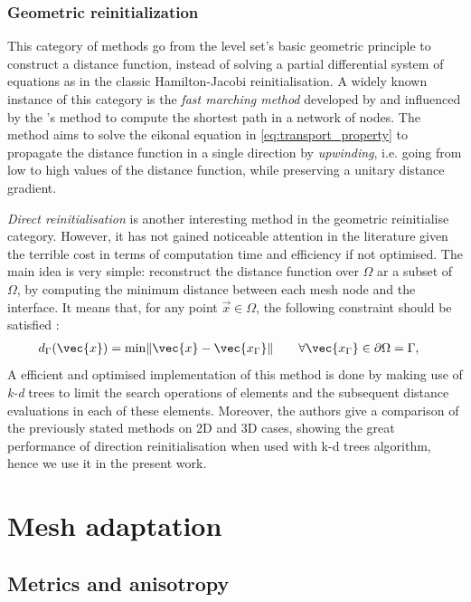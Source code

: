 \subsubsection{Geometric reinitialization}
%
This category of methods go from the level set's basic geometric principle to construct a distance function,
instead of solving a partial differential system of equations as in the classic Hamilton-Jacobi reinitialisation.
A widely known instance of this category is the \emph{fast marching method} developed by \citet{sethian_fast_1996}
and influenced by the \citet{dijkstra_note_1959}'s method to compute the shortest path in a network of nodes. 
The method aims to solve the eikonal equation in \cref{eq:transport_property} to propagate the distance function in a 
single direction by \emph{upwinding}, i.e. going from low to high values of the distance function, 
while preserving a unitary distance gradient.

\emph{Direct reinitialisation} is another interesting method in the geometric reinitialise category. However,
it has not gained noticeable attention in the literature given the terrible cost in terms of computation time and efficiency if not optimised.
The main idea is very simple: reconstruct the distance function over $\Omega$ ar a subset of $\Omega$, by computing the 
minimum distance between each mesh node and the interface. It means that, for any point $\vec{x} \in \Omega$, the following 
constraint should be satisfied \citet{osher_signed_2003}:
\begin{align}
\label{eq:min_distance}
& d_\Gamma(\vec{x}) = \min \norm{\vec{x}-\vec{x_\Gamma}} \qquad \forall \vec{x_\Gamma} \in \partial \Omega = \Gamma,
\end{align}
A efficient and optimised implementation of this method is done by \citet{shakoor_efficient_2015} making use of \emph{k-d} trees
to limit the search operations of elements and the subsequent distance evaluations in each of these elements.
Moreover, the authors give a comparison of the previously stated methods on 2D and 3D cases, showing the great 
performance of direction reinitialisation when used with k-d trees algorithm, hence we use it in the present work.
%
\section{Mesh adaptation}

\subsection{Metrics and anisotropy}

